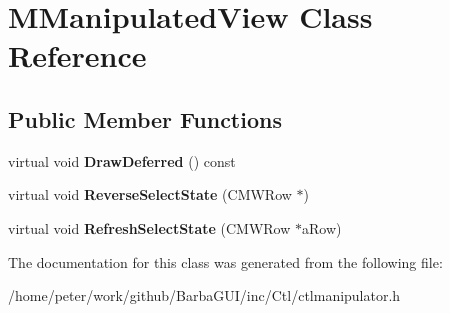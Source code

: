 \hypertarget{classMManipulatedView}{}\section{M\+Manipulated\+View Class Reference}
\label{classMManipulatedView}
\subsection*{Public Member Functions}
\begin{DoxyCompactItemize}
\item 
\mbox{\label{classMManipulatedView_a66605d81c25a0f577fd2ae6cf044a7a1}} 
virtual void {\bfseries Draw\+Deferred} () const
\item 
\mbox{\label{classMManipulatedView_a00807a16ce123251bd3b19ae62dc9d14}} 
virtual void {\bfseries Reverse\+Select\+State} (C\+M\+W\+Row $\ast$)
\item 
\mbox{\label{classMManipulatedView_a9b64587f5b9bf82a1987d7f62ccb0bcd}} 
virtual void {\bfseries Refresh\+Select\+State} (C\+M\+W\+Row $\ast$a\+Row)
\end{DoxyCompactItemize}


The documentation for this class was generated from the following file\+:\begin{DoxyCompactItemize}
\item 
/home/peter/work/github/\+Barba\+G\+U\+I/inc/\+Ctl/ctlmanipulator.\+h\end{DoxyCompactItemize}
